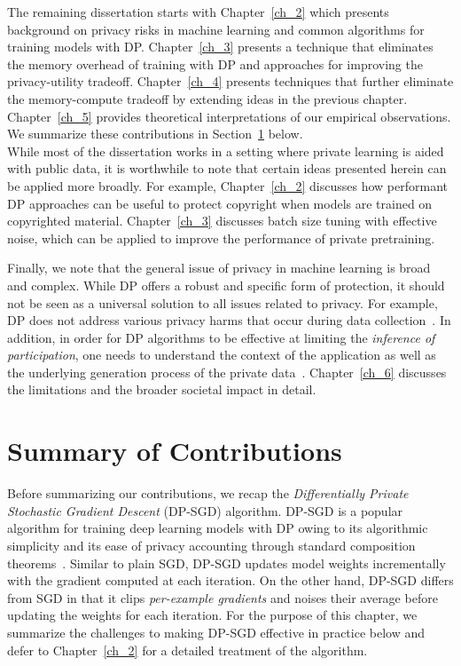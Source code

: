 The remaining dissertation starts with Chapter~\ref{ch_2} which presents background on privacy risks in machine learning and common algorithms for training models with DP.
Chapter~\ref{ch_3} presents a technique that eliminates the memory overhead of training with DP and approaches for improving the privacy-utility tradeoff.
Chapter~\ref{ch_4} presents techniques that further eliminate the memory-compute tradeoff by extending ideas in the previous chapter.
Chapter~\ref{ch_5} provides theoretical interpretations of our empirical observations.
We summarize these contributions in Section~\ref{sec:overview_of_results} below.\\

While most of the dissertation works in a setting where private learning is aided with public data, it is worthwhile to note that certain ideas presented herein can be applied more broadly. 
For example, Chapter~\ref{ch_2} discusses how performant DP approaches can be useful to protect copyright when models are trained on copyrighted material.
Chapter~\ref{ch_3} discusses batch size tuning with effective noise, which can be applied to improve the performance of private pretraining.

Finally, we note that the general issue of privacy in machine learning is broad and complex.
While DP offers a robust and specific form of protection, it should not be seen as a universal solution to all issues related to privacy.
For example, DP does not address various privacy harms that occur during data collection~\citep{solove2005taxonomy}.
In addition, in order for DP algorithms to be effective at limiting the \emph{inference of participation}, one needs to understand the context of the application as well as the underlying generation process of the private data~\citep{kifer2011no}. 
Chapter~\ref{ch_6} discusses the limitations and the broader societal impact in detail.

\section{Summary of Contributions}\label{sec:overview_of_results}

Before summarizing our contributions, we recap the \emph{Differentially Private Stochastic Gradient Descent} (DP-SGD) algorithm.
DP-SGD is a popular algorithm for training deep learning models with DP owing to its algorithmic simplicity and its ease of privacy accounting through standard composition theorems~\citep{dwork2014algorithmic}.
Similar to plain SGD, DP-SGD updates model weights incrementally with the gradient computed at each iteration.
On the other hand, DP-SGD differs from SGD in that it clips \emph{per-example gradients} and noises their average before updating the weights for each iteration. 
For the purpose of this chapter, we summarize the challenges to making DP-SGD effective in practice below and defer to Chapter~\ref{ch_2} for a detailed treatment of the algorithm. 

